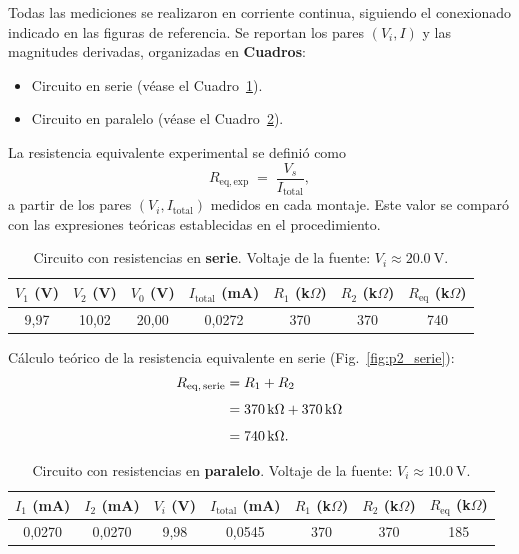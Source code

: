 \documentclass[11pt,twocolumn]{article}
\begin{document}
Todas las mediciones se realizaron en corriente continua, siguiendo el conexionado indicado en las figuras de referencia. Se reportan los pares $(V_i,I)$ y las magnitudes derivadas, organizadas en \textbf{Cuadros}:

\begin{itemize}
    \item Circuito en serie (véase el Cuadro~\ref{tab:serie}).
    \item Circuito en paralelo (véase el Cuadro~\ref{tab:paralelo}).
\end{itemize}

La resistencia equivalente experimental se definió como
\begin{equation*}
    R_{\mathrm{eq,exp}} \;=\; \frac{V_s}{I_{\text{total}}},
\end{equation*}
a partir de los pares $(V_i, I_{\text{total}})$ medidos en cada montaje. Este valor se comparó con las expresiones teóricas establecidas en el procedimiento.

\begin{table}
\centering
\caption{Circuito con resistencias en \textbf{serie}. Voltaje de la fuente: $V_i \approx 20.0~\text{V}$.}
\label{tab:serie}
\begin{tabular}{|c|c|c|c|c|c|c|}
\hline
$V_1$ (V) & $V_2$ (V) & $V_0$ (V) & $I_{\text{total}}$ (mA) & $R_1$ (k$\Omega$) & $R_2$ (k$\Omega$) & $R_{\text{eq}}$ (k$\Omega$) \\
\hline
9,97 & 10,02 & 20,00 & 0,0272 & 370 & 370 & 740 \\
\hline
\end{tabular}
\end{table}

Cálculo teórico de la resistencia equivalente en serie (Fig.~\ref{fig:p2_serie}):
\begin{align}
R_{\mathrm{eq,\,serie}}
  &= R_1 + R_2 \label{eq:resistencia_equivalente_en_serie}\\[4pt]
  &= 370\,\mathrm{k}\Omega + 370\,\mathrm{k}\Omega \notag \\[4pt]
  &= 740\,\mathrm{k}\Omega. \notag
\end{align}

\begin{table}
\centering
\caption{Circuito con resistencias en \textbf{paralelo}. Voltaje de la fuente: $V_i \approx 10.0~\text{V}$.}
\label{tab:paralelo}
\begin{tabular}{|c|c|c|c|c|c|c|}
\hline
$I_1$ (mA) & $I_2$ (mA) & $V_i$ (V) & $I_{\text{total}}$ (mA) & $R_1$ (k$\Omega$) & $R_2$ (k$\Omega$) & $R_{\text{eq}}$ (k$\Omega$) \\
\hline
0,0270 & 0,0270 & 9,98 & 0,0545 & 370 & 370 & 185 \\
\hline
\end{tabular}
\end{table}
\end{document}
